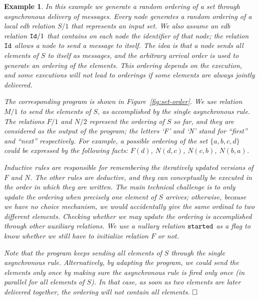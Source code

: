 \documentclass{tlp}
\newtheorem{example}[theorem]{Example}
\newcommand{\qed}{\hfill $\square$}
\renewcommand{\qed}{$\hfill \square$}  \newcommand{\tline}{\hrulefill}
\newcommand{\myset}[1]{\{#1\}}
\newcommand{\rar}[2]{#1/#2}
\begin{document}
\begin{example}
    \label{ex:set-order}
    In this example we generate a random ordering of a set through asynchronous delivery of messages. 
    Every node generates a random ordering of a local \emph{edb} relation $\rar S1$ that represents an input set. We also assume an \emph{edb} relation $\rar{\relid}1$ that contains on each node the identifier of that node; the relation $\mathtt{Id}$ allows a node to send a message to itself.
    The idea is that a node sends all elements of $S$ to itself as messages, and the arbitrary arrival order is used to generate an ordering of the elements. This ordering depends on the execution, and some executions will not lead to orderings if some elements are always jointly delivered.
    
    The corresponding program is shown in Figure~\ref{fig:set-order}. We use relation $\rar M1$ to send the elements of $S$, as accomplished by the single asynchronous rule.
    The relations $\rar F1$ and $\rar N2$ represent the ordering of $S$ so far, and they are considered as the output of the program; the letters `F' and `N' stand for ``first'' and ``next'' respectively. 
    For example, a possible ordering of the set $\myset{a,b,c,d}$ could be expressed by the following facts: $F(d)$, $N(d,c)$, $N(c,b)$, $N(b,a)$.
    
    Inductive rules are responsible for remembering the iteratively updated versions of $F$ and $N$. 
    The other rules are deductive, and they can conceptually be executed in the order in which they are written.
    The main technical challenge is to only update the ordering when precisely one element of $S$ arrives; otherwise, because we have no choice mechanism, we would accidentally give the same ordinal to two different elements. Checking whether we may update the ordering is accomplished through other auxiliary relations.
    We use a nullary relation $\mathtt{started}$ as a flag to know whether we still have to initialize relation $F$ or not.

    Note that the program keeps sending all elements of $S$ through the single asynchronous rule. 
    Alternatively, by adapting the program, we could send the elements only once by making sure the asynchronous rule is fired only once (in parallel for all elements of $S$).
    In that case, as soon as two elements are later delivered together, the ordering will not contain all elements.
    \qed
\end{example}
\end{document}

